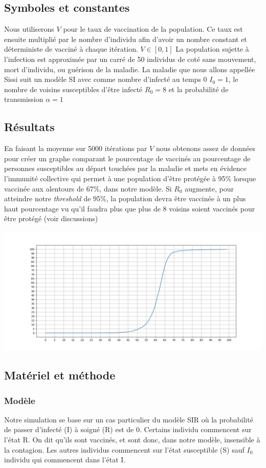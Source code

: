 \documentclass[10pt]{article}
\begin{document}
\subsection{Symboles et constantes}
Nous utiliserons $V$ pour le taux de vaccination de la population. Ce taux est ensuite multiplié par le nombre d'individu afin d'avoir un nombre constant et déterministe de vacciné à chaque itération. $V \in [0,1]$
La population sujette à l'infection est approximée par un carré de 50 individus de coté sans mouvement, mort d'individu, ou guérison de la maladie.
La maladie que nous allons appellée Sissi suit un modèle SI avec comme nombre d'infecté au temps 0 $I_0 = 1$, le nombre de voisins susceptibles d'être infecté $R_0 = 8$ et la probabilité de transmission $\alpha = 1$

\subsection{Résultats}
\label{sec:results}
En faisant la moyenne sur 5000 itérations par $V$ nous obtenons assez de données pour créer un graphe comparant le pourcentage de vaccinés au pourcentage de personnes susceptibles au départ touchées par la maladie et mets en évidence l'immunité collective qui permet à une population d'être protégée à 95\% lorsque vaccinée aux alentours de 67\%, dans notre modèle.
Si $R_0$ augmente, pour atteindre notre \textit{threshold} de 95\%, la population devra être vaccinée à un plus haut pourcentage vu qu'il faudra plus que plus de 8 voisins soient vaccinés pour être protégé (voir discussions)

\includegraphics[scale=0.3]{5000iter.png}


\subsection{Matériel et méthode}
\subsubsection{Modèle}
Notre simulation se base sur un cas particulier du modèle SIR où la probabilité de passer d'infecté (I) à soigné (R) est de 0. Certains individu commencent sur l'état R. On dit qu'ils sont vaccinés, et sont donc, dans notre modèle, insensible à la contagion. Les autres individus commencent sur l'état susceptible (S) sauf $I_0$ individu qui commencent dans l'état I.
\end{document}
